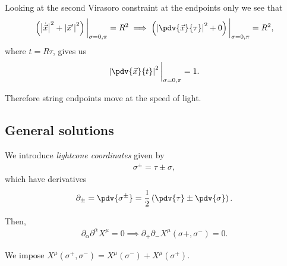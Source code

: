 Looking at the second Virasoro constraint at the endpoints only we see that
\begin{align}
    \left( \left| \dot{\vec{x}} \right|^2 + \left| \vec{x}' \right|^2  \right) \bigg|_{\sigma = 0, \pi}  = R^2 \implies \left( \left| \pdv{\vec{x}}{\tau} \right|^2 + 0 \right) \bigg|_{\sigma = 0, \pi}   = R^2
,\end{align}
where $t = R \tau$, gives us
\begin{align}
     \left| \pdv{\vec{x}}{t} \right|^2 \bigg|_{\sigma = 0, \pi}   = 1
.\end{align}

Therefore string endpoints move at the speed of light.

\subsection{General solutions}

We introduce \emph{lightcone coordinates} given by
\begin{align}
    \sigma^{\pm} = \tau \pm \sigma
,\end{align}
which have derivatives
\begin{align}
    \partial_\pm = \pdv{\sigma^{\pm}} = \frac{1}{2} \left( \pdv{\tau} \pm \pdv{\sigma} \right) 
.\end{align}

Then,
\begin{align}
    \partial_\alpha \partial^{\alpha} X^{\mu} = 0 \implies \partial_+ \partial_- X^{\mu}\left( \sigma+, \sigma^{-} \right)  = 0
.\end{align}

We impose $X^{\mu}\left( \sigma^{+}, \sigma^{-} \right) = X^{\mu}\left( \sigma^{-} \right) + X^{\mu} \left( \sigma^{+} \right)$.


